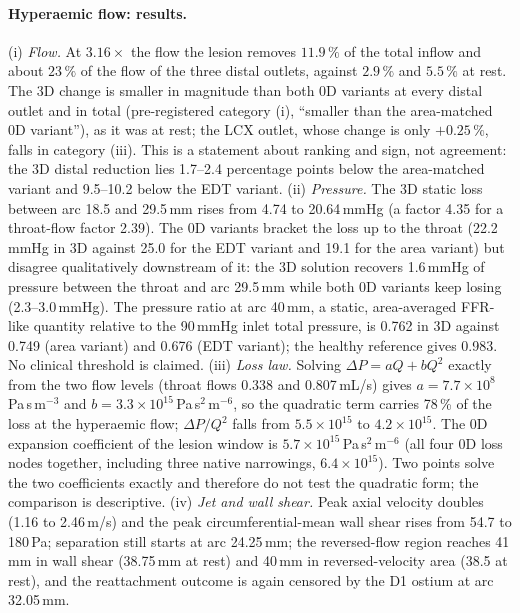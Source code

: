 \documentclass[11pt]{article}
\begin{document}
\paragraph{Hyperaemic flow: results.} (i) \emph{Flow.} At $3.16\times$ the flow the lesion removes $11.9\,\%$ of the total inflow and about $23\,\%$ of the flow of the three distal outlets, against $2.9\,\%$ and $5.5\,\%$ at rest. The 3D change is smaller in magnitude than both 0D variants at every distal outlet and in total (pre-registered category (i), ``smaller than the area-matched 0D variant''), as it was at rest; the LCX outlet, whose change is only $+0.25\,\%$, falls in category (iii). This is a statement about ranking and sign, not agreement: the 3D distal reduction lies 1.7--2.4 percentage points below the area-matched variant and 9.5--10.2 below the EDT variant. (ii) \emph{Pressure.} The 3D static loss between arc 18.5 and 29.5\,mm rises from 4.74 to 20.64\,mmHg (a factor 4.35 for a throat-flow factor 2.39). The 0D variants bracket the loss up to the throat (22.2\,mmHg in 3D against 25.0 for the EDT variant and 19.1 for the area variant) but disagree qualitatively downstream of it: the 3D solution recovers 1.6\,mmHg of pressure between the throat and arc 29.5\,mm while both 0D variants keep losing (2.3--3.0\,mmHg). The pressure ratio at arc 40\,mm, a static, area-averaged FFR-like quantity relative to the 90\,mmHg inlet total pressure, is 0.762 in 3D against 0.749 (area variant) and 0.676 (EDT variant); the healthy reference gives 0.983. No clinical threshold is claimed. (iii) \emph{Loss law.} Solving $\Delta P=aQ+bQ^2$ exactly from the two flow levels (throat flows 0.338 and 0.807\,mL/s) gives $a=7.7\times10^8$\,Pa\,s\,m$^{-3}$ and $b=3.3\times10^{15}$\,Pa\,s$^2$\,m$^{-6}$, so the quadratic term carries 78\,\% of the loss at the hyperaemic flow; $\Delta P/Q^2$ falls from $5.5\times10^{15}$ to $4.2\times10^{15}$. The 0D expansion coefficient of the lesion window is $5.7\times10^{15}$\,Pa\,s$^2$\,m$^{-6}$ (all four 0D loss nodes together, including three native narrowings, $6.4\times10^{15}$). Two points solve the two coefficients exactly and therefore do not test the quadratic form; the comparison is descriptive. (iv) \emph{Jet and wall shear.} Peak axial velocity doubles (1.16 to 2.46\,m/s) and the peak circumferential-mean wall shear rises from 54.7 to 180\,Pa; separation still starts at arc 24.25\,mm; the reversed-flow region reaches 41\,mm in wall shear (38.75\,mm at rest) and 40\,mm in reversed-velocity area (38.5 at rest), and the reattachment outcome is again censored by the D1 ostium at arc 32.05\,mm.
\end{document}
